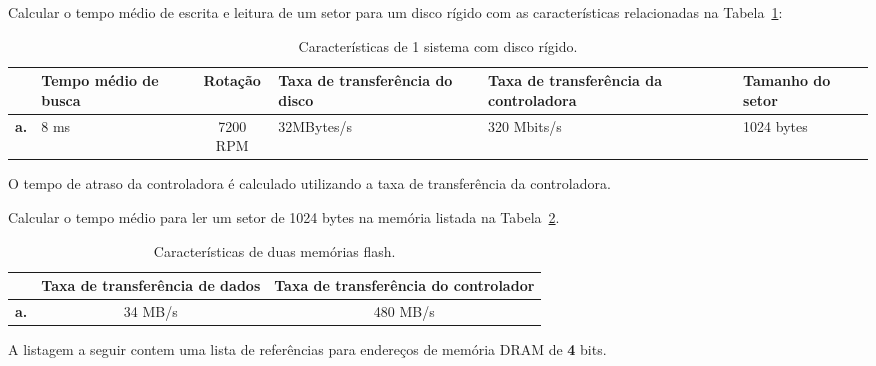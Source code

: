 
Calcular o tempo médio de escrita e leitura de um setor para um disco
rígido com as características relacionadas na Tabela~\ref{tab:disk}:

\begin{table}[ht]
\begin{center}
\begin{tabular}{|c|p{2.2cm}|c|p{2.2cm}|p{2.2cm}|p{2.2cm}|}\hline
  & \footnotesize Tempo médio de busca &  Rotação &  \footnotesize
  Taxa de transferência do disco  & \footnotesize Taxa de
  transferência da controladora  & \footnotesize Tamanho do setor\\\hline
  \bf a. & 8 ms & 7200 RPM & 32MBytes/s & 320 Mbits/s & 1024 bytes\\\hline
\end{tabular}
\caption{Características de 1 sistema com disco rígido.}
\label{tab:disk}
\end{center}
\end{table}

\noindent O tempo de atraso da controladora é calculado utilizando a
taxa de transferência da controladora.

 Calcular o tempo médio para
ler um setor de 1024 bytes na memória listada na
Tabela~\ref{tab:flash}.

\begin{table}[ht]
  \centering
  \begin{tabular}[ht]{|c|c|c|}\hline
    & \footnotesize Taxa de transferência de dados&
    \footnotesize Taxa de transferência do controlador\\\hline
    \bf a. & 34 MB/s & 480 MB/s\\\hline
  \end{tabular}
  \caption{Características de duas memórias flash.}
  \label{tab:flash}
\end{table}


A listagem a seguir contem uma lista de referências para endereços
de memória DRAM de {\bf 4} bits.

\begin{center}
  \tt
 \rand{} \rand{}
 \rand{} \rand{} \rand{} \rand{}
 \rand{} \rand{}
\end{center}

